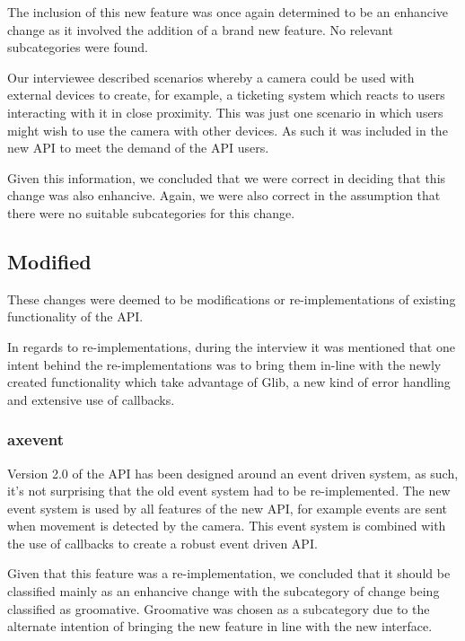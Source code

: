 \documentclass{sig-alternate}
\begin{document}
The inclusion of this new feature was once again determined to be an enhancive change as it involved the addition of a brand new feature. No relevant subcategories were found.

Our interviewee described scenarios whereby a camera could be used with external devices to create, for example, a ticketing system which reacts to users interacting with it in close proximity. This was just one scenario in which users might wish to use the camera with other devices. As such it was included in the new API to meet the demand of the API users.

Given this information, we concluded that we were correct in deciding that this change was also enhancive. Again, we were also correct in the assumption that there were no suitable subcategories for this change.

\subsection{Modified}
These changes were deemed to be modifications or re-implementations of existing functionality of the API. 

In regards to re-implementations, during the interview it was mentioned that one intent behind the re-implementations was to bring them in-line with the newly created functionality which take advantage of Glib, a new kind of error handling and extensive use of callbacks.

\subsubsection{axevent}

Version 2.0 of the API has been designed around an event driven system, as such, it's not surprising that the old event system had to be re-implemented. The new event system is used by all features of the new API, for example events are sent when movement is detected by the camera. This event system is combined with the use of callbacks to create a robust event driven API.

Given that this feature was a re-implementation, we concluded that it should be classified mainly as an enhancive change with the subcategory of change being classified as groomative. Groomative was chosen as a subcategory due to the alternate intention of bringing the new feature in line with the new interface.
\end{document}
